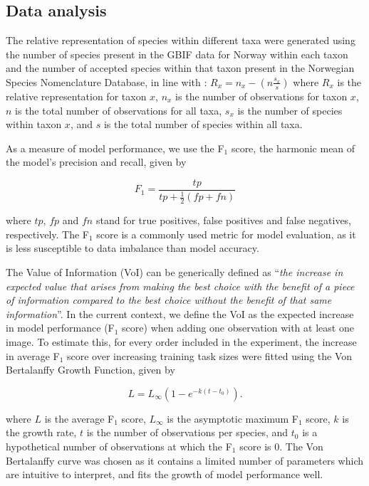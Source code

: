 \documentclass{article}
\begin{document}
\subsection*{Data analysis}
The relative representation of species within different taxa were generated using the number of species present in the GBIF data for Norway within each taxon and the number of accepted species within that taxon present in the Norwegian Species Nomenclature Database\autocite{Artsnavnebase}, in line with \citeauthor{Troudet2017}\autocite{Troudet2017}: \(R_x = n_x - (n \frac{s_x}{s}) \) where \(R_x\) is the relative representation for taxon \(x\), \(n_x \) is the number of observations for taxon \(x\), \(n\) is the total number of observations for all taxa, \(s_x\) is the number of species within taxon \(x\), and \(s\) is the total number of species within all taxa.

As a measure of model performance, we use the F\(_1\) score, the harmonic mean of the model's precision and recall, given by

\[ F_1 = \frac{tp}{tp + \frac{1}{2}(fp + fn)} \]


where \(tp\), \(fp\) and \(fn\) stand for true positives, false positives and false negatives, respectively. The F\(_1\) score is a commonly used metric for model evaluation, as it is less susceptible to data imbalance than model accuracy\autocite{Goodfellow-et-al-2016}.

The Value of Information (VoI) can be generically defined as ``\textit{the increase in expected value that arises from making the best choice with the benefit of a piece of information compared to the best choice without the benefit of that same information}''\autocite{Keisler2013}. In the current context, we define the VoI as the expected increase in model performance (F\(_1\) score) when adding one observation with at least one image. To estimate this, for every order included in the experiment, the increase in average F\(_1\) score over increasing training task sizes were fitted using the Von Bertalanffy Growth Function, given by

\[ L = L_\infty(1 - e^{-k(t-t_0)}). \]

where \(L\) is the average F\(_1\) score, \(L_\infty\) is the asymptotic maximum F\(_1\) score, \(k\) is the growth rate, \(t\) is the number of observations per species, and \(t_0\) is a hypothetical number of observations at which the F\(_1\) score is 0. The Von Bertalanffy curve was chosen as it contains a limited number of parameters which are intuitive to interpret, and fits the growth of model performance well.
\end{document}
